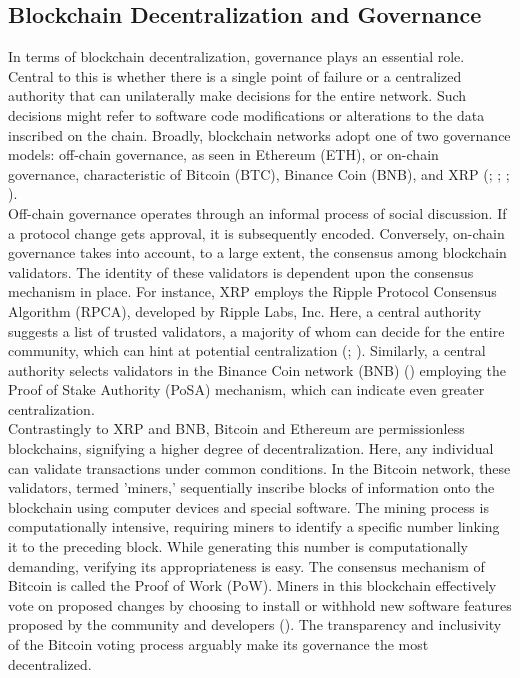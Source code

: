 \documentclass[twocolumn]{article}
\begin{document}
\subsection{Blockchain Decentralization and Governance}
In terms of blockchain decentralization, governance plays an essential role. Central to this is whether there is a single point of failure or a centralized authority that can unilaterally make decisions for the entire network. Such decisions might refer to software code modifications or alterations to the data inscribed on the chain. Broadly, blockchain networks adopt one of two governance models: off-chain governance, as seen in Ethereum (ETH), or on-chain governance, characteristic of Bitcoin (BTC), Binance Coin (BNB), and XRP (\cite{noauthor_ethereum_2023}; \cite{noauthor_governance_2023}; \cite{lee_analysis_2023}; \cite{rochard_bitcoin_2020}).
\\Off-chain governance operates through an informal process of social discussion. If a protocol change gets approval, it is subsequently encoded. Conversely, on-chain governance takes into account, to a large extent, the consensus among blockchain validators. The identity of these validators is dependent upon the consensus mechanism in place. For instance, XRP employs the Ripple Protocol Consensus Algorithm (RPCA), developed by Ripple Labs, Inc. Here, a central authority suggests a list of trusted validators, a majority of whom can decide for the entire community, which can hint at potential centralization (\cite{christodoulou_consensus_2020}; \cite{thomas_how_2017}). Similarly, a central authority selects validators in the Binance Coin network (BNB) (\cite{maksymyuk_blockchain-empowered_2022}) employing the Proof of Stake Authority (PoSA) mechanism, which can indicate even greater centralization.
\\Contrastingly to XRP and BNB, Bitcoin and Ethereum are permissionless blockchains, signifying a higher degree of decentralization. Here, any individual can validate transactions under common conditions. In the Bitcoin network, these validators, termed 'miners,' sequentially inscribe blocks of information onto the blockchain using computer devices and special software. The mining process is computationally intensive, requiring miners to identify a specific number linking it to the preceding block. While generating this number is computationally demanding, verifying its appropriateness is easy. The consensus mechanism of Bitcoin is called the Proof of Work (PoW). Miners in this blockchain effectively vote on proposed changes by choosing to install or withhold new software features proposed by the community and developers (\cite{rochard_bitcoin_2020}). The transparency and inclusivity of the Bitcoin voting process arguably make its governance the most decentralized.
\end{document}
